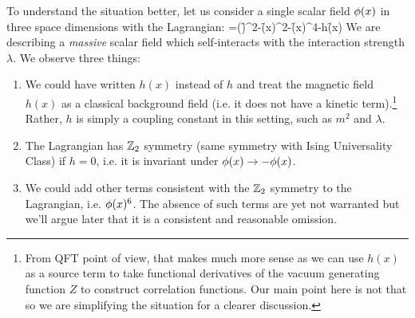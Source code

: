 \documentclass[12pt]{article}
\numberwithin{equation}{section}
\begin{document}
To understand the situation better, let us consider a single scalar field $\phi(x)$ in three space dimensions with the Lagrangian:
\be 
\label{eq: 3d scalar field}
\cL=\half(\partial\f)^2-\f(x)^2-\f(x)^4-h\f(x)
\ee 
We are describing a \emph{massive} scalar field which self-interacts with the interaction strength $\lambda$. We observe three things:
\begin{enumerate}
	\item We could have written $h(x)$ instead of $h$ and treat the magnetic field $h(x)$ as a classical background field (i.e. it does not have a kinetic term).\footnote{From QFT point of view, that makes much more sense as we can use $h(x)$ as a source term to take functional derivatives of the vacuum generating function $Z$ to construct correlation functions. Our main point here is not that so we are simplifying the situation for a clearer discussion.} Rather, $h$ is simply a coupling constant in this setting, such as $m^2$ and $\lambda$.
	\item The Lagrangian has $\mathbb{Z}_2$ symmetry (same symmetry with Ising Universality Class) if $h=0$, i.e. it is invariant under $\phi(x)\rightarrow-\phi(x)$.
	\item We could add other terms consistent with the $\mathbb{Z}_2$ symmetry to the Lagrangian, i.e. $\phi(x)^6$. The absence of such terms are yet not warranted but we'll argue later that it is a consistent and reasonable omission.
\end{enumerate}
\end{document}
